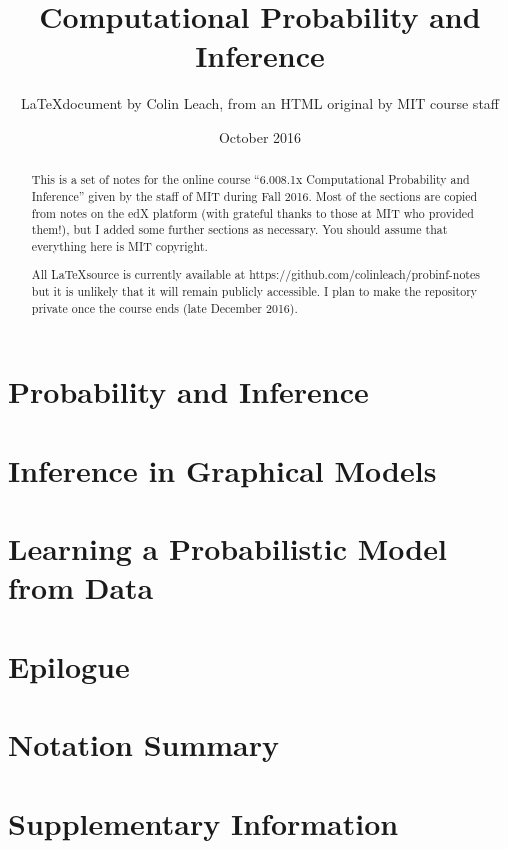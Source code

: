 

\title{Computational Probability and Inference}
\author{\LaTeX document by Colin Leach, from an HTML original by MIT course staff\\}
\date{October 2016}
\maketitle

\begin{abstract}
This is a set of notes for the online course ``6.008.1x Computational Probability and Inference'' given by the staff of MIT during Fall 2016. Most of the sections are copied from notes on the edX platform (with grateful thanks to those at MIT who provided them!), but I added some further sections as necessary. You should assume that everything here is MIT copyright.

All \LaTeX source is currently available at https://github.com/colinleach/probinf-notes but it is unlikely that it will remain publicly accessible. I plan to make the repository private once the course ends (late December 2016).
\end{abstract}

\tableofcontents

\setlength{\parindent}{0pt}
\setlength{\parskip}{0.5em}
\setlength{\intextsep}{2mm}

\chapter{Probability and Inference}












\chapter{Inference in Graphical Models}








\chapter{Learning a Probabilistic Model from Data}





\chapter{Epilogue}


\appendix
\chapter{Notation Summary}


\chapter{Supplementary Information}


